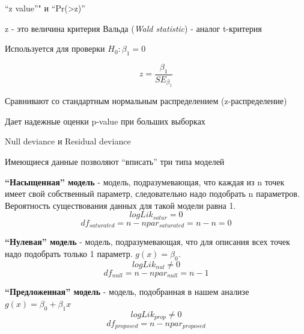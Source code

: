 \documentclass[ignorenonframetext,]{beamer}
\begin{document}
\begin{frame}{``z value''" и ``Pr(\textgreater{}z)''}

z - это величина критерия Вальда (\emph{Wald statistic}) - аналог
t-критерия

Используется для проверки \(H_0: \beta_1=0\)

\[z=\frac{\beta_1}{SE_{\beta_1}}\]

Сравнивают со стандартным нормальным распределением (z-распределение)

Дает надежные оценки p-value при больших выборках

\end{frame}

\begin{frame}{Null deviance и Residual deviance}

Имеющиеся данные позволяют ``вписать'' три типа моделей

\textbf{``Насыщенная'' модель} - модель, подразумевающая, что каждая из
n точек имеет свой собственный параметр, следовательно надо подобрать n
параметров. Вероятность существования данных для такой модели равна 1.
\[logLik_{satur}=0\]
\[df_{saturated} = n - npar_{saturated}  = n - n = 0\]

\textbf{``Нулевая'' модель} - модель, подразумевающая, что для описания
всех точек надо подобрать только 1 параметр. \(g(x) = \beta_0\).
\[logLik_{nul} \ne 0\] \[df_{null} = n - npar_{null} = n - 1\]

\textbf{``Предложенная'' модель} - модель, подобранная в нашем анализе
\(g(x) = \beta_0 + \beta_1x\) \[logLik_{prop} \ne 0\]
\[df_{proposed} = n - npar_{proposed}\]

\end{frame}
\end{document}
